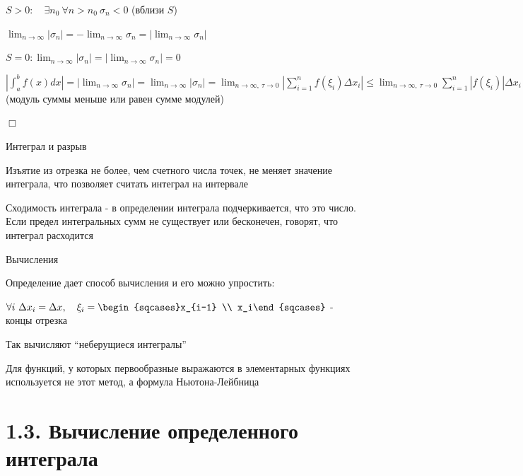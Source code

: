 \documentclass[12pt]{article}
\begin{document}
\begin{enumerate}
        $S > 0: \quad \exists n_0 \ \forall n > n_0 \ \sigma_n < 0$ (вблизи $S$)

        $\lim_{n\to\infty} |\sigma_n| = -\lim_{n\to\infty} \sigma_n = |\lim_{n\to\infty} \sigma_n|$

        $S = 0: \lim_{n\to\infty} |\sigma_n| = |\lim_{n\to\infty} \sigma_n| = 0$

        $\left| \int^b_a f(x)dx \left| = |\lim_{n\to\infty} \sigma_n| = \lim_{n\to\infty} |\sigma_n| =
        \lim_{n\to\infty,\ \tau\to0} \left|\sum_{i=1}^n f(\xi_i) \Delta x_i\right| \leq \lim_{n\to\infty,\ \tau\to0} \sum_{i=1}^n |f(\xi_i)| \Delta x_i$ (модуль суммы меньше или равен сумме модулей)

        $\Box$

    \end{enumerate}

    \Nota Интеграл и разрыв

    Изъятие из отрезка не более, чем счетного числа точек, не меняет значение интеграла, что позволяет считать интеграл на интервале

    \Nota Сходимость интеграла - в определении интеграла подчеркивается, что это число.
    Если предел интегральных сумм не существует или бесконечен, говорят, что интеграл расходится

    \Nota Вычисления

    Определение дает способ вычисления и его можно упростить:

    $\forall i\ \Delta x_i = \Delta x, \quad \xi_i = \begin{sqcases}x_{i-1} \\ x_i\end{sqcases}$ - концы отрезка

    Так вычисляют \enquote{неберущиеся интегралы}

    Для функций, у которых первообразные выражаются в элементарных функциях используется не этот метод, а формула Ньютона-Лейбница

    \section{1.3. Вычисление определенного интеграла}
\end{document}
